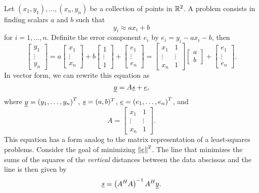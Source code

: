 Let $(x_1, y_1), \ldots, (x_n, y_n)$ be a collection of points in $\mathbb{R}^2$.
A  problem consists in finding scalars $a$ and $b$ such that
\begin{equation*}
y_i \approx a x_i + b
\end{equation*}
for $i = 1, \ldots, n$.
Definite the error component $e_i$ by $e_i = y_i - a x_i - b$, then
\begin{equation*}
\begin{bmatrix} y_1 \\ \vdots \\ y_n \end{bmatrix}
= a \begin{bmatrix} x_1 \\ \vdots \\ x_n \end{bmatrix}
+ b \begin{bmatrix} 1 \\ \vdots \\ 1 \end{bmatrix}
+ \begin{bmatrix} e_1 \\ \vdots \\ e_n \end{bmatrix}
= \begin{bmatrix} x_1 & 1 \\ \vdots & \vdots \\ x_n & 1 \end{bmatrix}
\begin{bmatrix} a \\ b \end{bmatrix}
+ \begin{bmatrix} e_1 \\ \vdots \\ e_n \end{bmatrix} .
\end{equation*}
In vector form, we can rewrite this equation as
\begin{equation*}
\underline{y} = A \underline{s} + \underline{e},
\end{equation*}
where $\underline{y} = \left( y_1, \ldots, y_n \right)^T$, $\underline{s} = (a, b)^T$, $\underline{e} = \left( e_1, \ldots, e_n \right)^T$, and
\begin{equation*}
A = \begin{bmatrix} x_1 & 1 \\
\vdots & \vdots \\ x_n & 1 \end{bmatrix} .
\end{equation*}
This equation has a form analog to the matrix representation of a least-squares problems.
Consider the goal of minimizing $\left\| \underline{e} \right\|^2$.
The line that minimizes the sums of the squares of the \emph{vertical} distances between the data abscissas and the line is then given by
\begin{equation*}
\underline{s} = \left( A^H A \right)^{-1} A^H \underline{y} .
\end{equation*}


